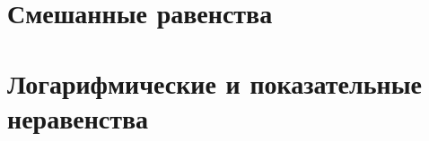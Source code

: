 \documentclass{article}
\begin{document}
\section*{Смешанные равенства}
\begin{enumerate}
	
\end{enumerate}

\section*{Логарифмические и показательные неравенства}
\end{document}
